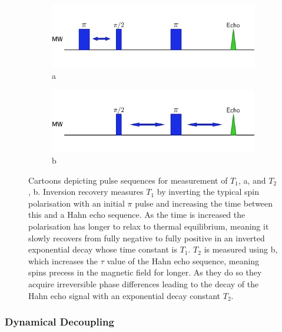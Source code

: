 \begin{figure}
\centering
\begin{subfigure}[t]{\columnwidth}
\centering
\includegraphics[width=\columnwidth]{Figures/inversionRecovery.pdf}{a}
\end{subfigure}
\begin{subfigure}[t]{\columnwidth}
\centering
\includegraphics[width=\columnwidth]{Figures/t2.pdf}{b}
\end{subfigure}
\caption[Inversion recovery and $T_2$ pulse sequences]{Cartoons depicting pulse sequences for measurement of $T_1$, a, and $T_2$, b. Inversion recovery measures $T_1$ by inverting the typical spin polarisation with an initial $\pi$ pulse and increasing the time between this and a Hahn echo sequence. As the time is increased the polarisation has longer to relax to thermal equilibrium, meaning it slowly recovers from fully negative to fully positive in an inverted exponential decay whose time constant is $T_1$. $T_2$ is measured using b, which increases the $\tau$ value of the Hahn echo sequence, meaning spins precess in the magnetic field for longer. As they do so they acquire irreversible phase differences leading to the decay of the Hahn echo signal with an exponential decay constant $T_2$.}
\label{fig:t1t2}
\end{figure}

\subsubsection{Dynamical Decoupling}

